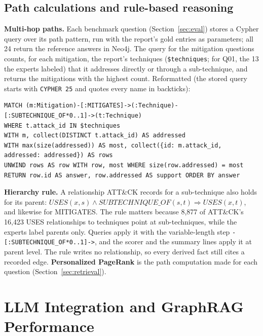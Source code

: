 \documentclass[conference,letterpaper]{IEEEtran}
\newcommand{\code}[1]{\texttt{#1}}
\begin{document}
\subsection{Path calculations and rule-based reasoning}\label{sec:rules}
\textbf{Multi-hop paths.} Each benchmark question (Section~\ref{sec:eval}) stores a Cypher query over its path pattern, run with the report's gold entries as parameters; all 24 return the reference answers in Neo4j. The query for the mitigation questions counts, for each mitigation, the report's techniques (\code{\$techniques}; for Q01, the 13 the experts labeled) that it addresses directly or through a sub-technique, and returns the mitigations with the highest count. Reformatted (the stored query starts with \code{CYPHER 25} and quotes every name in backticks):
\begin{lstlisting}
MATCH (m:Mitigation)-[:MITIGATES]->(:Technique)-[:SUBTECHNIQUE_OF*0..1]->(t:Technique)
WHERE t.attack_id IN $techniques
WITH m, collect(DISTINCT t.attack_id) AS addressed
WITH max(size(addressed)) AS most, collect({id: m.attack_id, addressed: addressed}) AS rows
UNWIND rows AS row WITH row, most WHERE size(row.addressed) = most
RETURN row.id AS answer, row.addressed AS support ORDER BY answer
\end{lstlisting}
\textbf{Hierarchy rule.} A relationship ATT\&CK records for a sub-technique also holds for its parent: $\mathit{USES}(x,s) \wedge \mathit{SUBTECHNIQUE\_OF}(s,t) \Rightarrow \mathit{USES}(x,t)$, and likewise for MITIGATES. The rule matters because 8,877 of ATT\&CK's 16,423 USES relationships to techniques point at sub-techniques, while the experts label parents only. Queries apply it with the variable-length step \code{-[:SUBTECHNIQUE\_OF*0..1]->}, and the scorer and the summary lines apply it at parent level. The rule writes no relationship, so every derived fact still cites a recorded edge. \textbf{Personalized PageRank} is the path computation made for each question (Section~\ref{sec:retrieval}).

\section{LLM Integration and GraphRAG Performance}\label{sec:llm}
\end{document}
